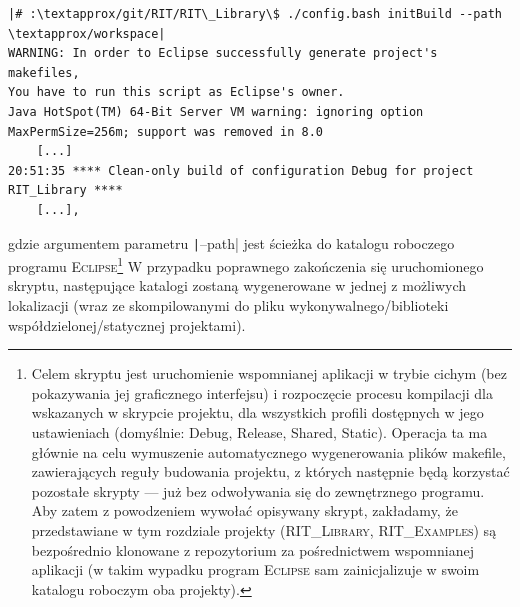 \begin{verbatim}
|# :\textapprox/git/RIT/RIT\_Library\$ ./config.bash initBuild --path \textapprox/workspace|
WARNING: In order to Eclipse successfully generate project's makefiles, 
You have to run this script as Eclipse's owner.
Java HotSpot(TM) 64-Bit Server VM warning: ignoring option MaxPermSize=256m; support was removed in 8.0
	[...]
20:51:35 **** Clean-only build of configuration Debug for project RIT_Library ****
	[...],
\end{verbatim}
gdzie argumentem parametru \texttt|--path| jest ścieżka do katalogu roboczego programu \textsc{Eclipse}\footnote{Celem skryptu jest uruchomienie wspomnianej aplikacji w trybie cichym (bez pokazywania jej graficznego interfejsu) i rozpoczęcie procesu kompilacji dla wskazanych w skrypcie projektu, dla wszystkich profili dostępnych w jego ustawieniach (domyślnie: \textsf{Debug}, \textsf{Release}, \textsf{Shared}, \textsf{Static}). Operacja ta ma głównie na celu wymuszenie automatycznego wygenerowania plików \textsf{makefile}, zawierających reguły budowania projektu, z których następnie będą korzystać pozostałe skrypty --- już bez odwoływania się do zewnętrznego programu. Aby zatem z powodzeniem wywołać opisywany skrypt, zakładamy, że przedstawiane w tym rozdziale projekty (\textsc{RIT\_Library}, \textsc{RIT\_Examples}) są bezpośrednio klonowane z repozytorium za pośrednictwem wspomnianej aplikacji (w takim wypadku program \textsc{Eclipse} sam zainicjalizuje w swoim katalogu roboczym oba projekty).} W przypadku poprawnego zakończenia się uruchomionego skryptu, następujące katalogi zostaną wygenerowane w jednej z możliwych lokalizacji (wraz ze skompilowanymi do pliku wykonywalnego/biblioteki współdzielonej/statycznej projektami).

